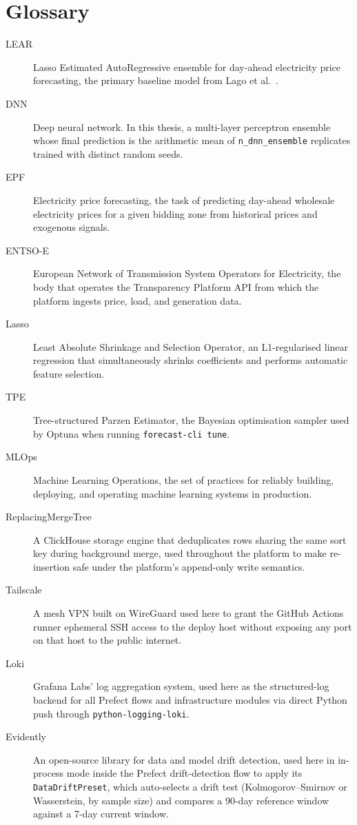 \chapter{Glossary}
\label{app:glossary}


\begin{description}
  \item[LEAR] Lasso Estimated AutoRegressive ensemble for day-ahead electricity
        price forecasting, the primary baseline model from Lago et al.\
        \cite{lago2021}.
  \item[DNN] Deep neural network. In this thesis, a multi-layer perceptron
        ensemble whose final prediction is the arithmetic mean of
        \texttt{n\_dnn\_ensemble} replicates trained with distinct random seeds.
  \item[EPF] Electricity price forecasting, the task of predicting day-ahead
        wholesale electricity prices for a given bidding zone from historical
        prices and exogenous signals.
  \item[ENTSO-E] European Network of Transmission System Operators for
        Electricity, the body that operates the Transparency Platform API from
        which the platform ingests price, load, and generation data.
  \item[Lasso] Least Absolute Shrinkage and Selection Operator, an
        L1-regularised linear regression that simultaneously shrinks
        coefficients and performs automatic feature selection.
  \item[TPE] Tree-structured Parzen Estimator, the Bayesian optimisation
        sampler used by Optuna when running \texttt{forecast-cli tune}.
  \item[MLOps] Machine Learning Operations, the set of practices for
        reliably building, deploying, and operating machine learning systems
        in production.
  \item[ReplacingMergeTree] A ClickHouse storage engine that deduplicates
        rows sharing the same sort key during background merge, used throughout
        the platform to make re-insertion safe under the platform's
        append-only write semantics.
  \item[Tailscale] A mesh VPN built on WireGuard used here to grant the
        GitHub Actions runner ephemeral SSH access to the deploy host without
        exposing any port on that host to the public internet.
  \item[Loki] Grafana Labs' log aggregation system, used here as the
        structured-log backend for all Prefect flows and infrastructure modules
        via direct Python push through \texttt{python-logging-loki}.
  \item[Evidently] An open-source library for data and model drift detection,
        used here in in-process mode inside the Prefect drift-detection flow to
        apply its \texttt{DataDriftPreset}, which auto-selects a drift test
        (Kolmogorov--Smirnov or Wasserstein, by sample size) and compares a 90-day reference window
        against a 7-day current window.
\end{description}


